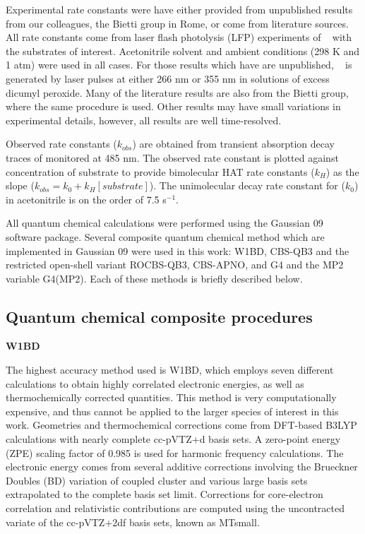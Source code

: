 Experimental rate constants were have either provided from unpublished results from our colleagues, the Bietti group in Rome, or come from literature sources.\cite{Bietti2010, Bietti2011, Pischel2001, Salamone2011, Salamone2012, Salamone2012a, Salamone2013, Salamone2015} All rate constants come from laser flash photolysis (LFP) experiments of \cumo~ with the substrates of interest. Acetonitrile solvent and ambient conditions (298 K and 1 atm) were used in all cases. For those results which have are unpublished, \cumo~ is generated by laser pulses at either 266 nm or 355 nm in solutions of excess dicumyl peroxide. Many of the literature results are also from the Bietti group, where the same procedure is used. Other results may have small variations in experimental details, however, all results are well time-resolved.

Observed rate constants ($k_{obs}$) are obtained from transient absorption decay traces of \cumo monitored at 485 nm. The observed rate constant is plotted against concentration of substrate to provide bimolecular HAT rate constants ($k_H$) as the slope ($k_{obs} = k_0 + k_H[substrate]$). The unimolecular decay rate constant for \cumo ($k_0$) in acetonitrile is on the order of 7.5  s$^{-1}$.\cite{Avila1995}

All quantum chemical calculations were performed using the Gaussian 09 software package.\cite{Frisch2009} Several composite quantum chemical method which are implemented in Gaussian 09 were used in this work: W1BD, CBS-QB3 and the restricted open-shell variant ROCBS-QB3, CBS-APNO, and G4 and the MP2 variable G4(MP2). Each of these methods is briefly described below.


\subsection{Quantum chemical composite procedures}

\noindent \textbf{W1BD}

The highest accuracy method used is W1BD, which employs seven different calculations to obtain highly correlated electronic energies, as well as thermochemically corrected quantities. This method is very computationally expensive, and thus cannot be applied to the larger species of interest in this work. Geometries and thermochemical corrections come from DFT-based B3LYP calculations with nearly complete cc-pVTZ+d basis sets. A zero-point energy (ZPE) scaling factor of 0.985 is used for harmonic frequency calculations. The electronic energy comes from several additive corrections involving the Brueckner Doubles\cite{Barnes2009} (BD) variation of coupled cluster and various large basis sets extrapolated to the complete basis set limit. Corrections for core-electron correlation and relativistic contributions are computed using the uncontracted variate of the cc-pVTZ+2df basis sets, known as MTsmall.\cite{Martin1999}
\\

